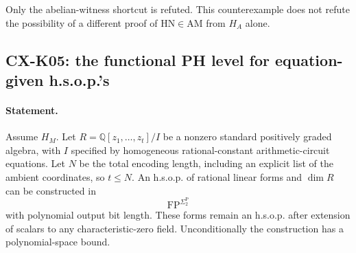 \documentclass[11pt,a4paper]{article}
\begin{document}
Only the abelian-witness shortcut is refuted. This counterexample does
not refute the possibility of a different proof of
$\mathrm{HN}\in\mathrm{AM}$ from $H_A$ alone.

\subsection{CX-K05: the functional PH level for equation-given h.s.o.p.'s}
\label{cx:k05}

\paragraph{Statement.}
Assume $H_M$. Let
$R=\mathbb Q[z_1,\ldots,z_t]/I$ be a nonzero standard positively
graded algebra, with $I$ specified by homogeneous rational-constant
arithmetic-circuit equations. Let $N$ be the total encoding length,
including an explicit list of the ambient coordinates, so $t\le N$.
An h.s.o.p. of rational linear forms and $\dim R$ can be constructed
in
\[
 \mathrm{FP}^{\Sigma_2^{\mathrm P}}
\]
with polynomial output bit length. These forms remain an h.s.o.p.
after extension of scalars to any characteristic-zero field.
Unconditionally the construction has a polynomial-space bound.
\end{document}
